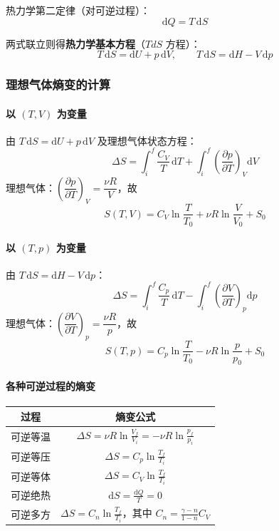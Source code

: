 \documentclass[UTF8]{ctexart}
\begin{document}
热力学第二定律（对可逆过程）：
\[
\mathrm{d}Q=T\,\mathrm{d}S
\]

两式联立则得\textbf{热力学基本方程}（$TdS$ 方程）：
\[
\boxed{T\,\mathrm{d}S=\mathrm{d}U+p\,\mathrm{d}V},\qquad
\boxed{T\,\mathrm{d}S=\mathrm{d}H-V\,\mathrm{d}p}
\]

\subsubsection{理想气体熵变的计算}

\paragraph{以 $(T,V)$ 为变量}
由 $T\,\mathrm{d}S=\mathrm{d}U+p\,\mathrm{d}V$ 及理想气体状态方程：
\[
\Delta S=\int_i^f\frac{C_V}{T}\,\mathrm{d}T+\int_i^f\left(\frac{\partial p}{\partial T}\right)_V\mathrm{d}V
\]
理想气体：$\left(\dfrac{\partial p}{\partial T}\right)_V=\dfrac{\nu R}{V}$，故
\[
\boxed{S(T,V)=C_V\ln\frac{T}{T_0}+\nu R\ln\frac{V}{V_0}+S_0}
\]

\paragraph{以 $(T,p)$ 为变量}
由 $T\,\mathrm{d}S=\mathrm{d}H-V\,\mathrm{d}p$：
\[
\Delta S=\int_i^f\frac{C_p}{T}\,\mathrm{d}T-\int_i^f\left(\frac{\partial V}{\partial T}\right)_p\mathrm{d}p
\]
理想气体：$\left(\dfrac{\partial V}{\partial T}\right)_p=\dfrac{\nu R}{p}$，故
\[
\boxed{S(T,p)=C_p\ln\frac{T}{T_0}-\nu R\ln\frac{p}{p_0}+S_0}
\]

\paragraph{各种可逆过程的熵变}

\begin{center}
\begin{tabular}{c|c}
\hline
过程 & 熵变公式 \\
\hline
可逆等温 & $\displaystyle\Delta S=\nu R\ln\frac{V_f}{V_i}=-\nu R\ln\frac{p_f}{p_i}$ \\
可逆等压 & $\displaystyle\Delta S=C_p\ln\frac{T_f}{T_i}$ \\
可逆等体 & $\displaystyle\Delta S=C_V\ln\frac{T_f}{T_i}$ \\
可逆绝热 & $\displaystyle\mathrm{d}S=\frac{\mathrm{d}Q}{T}=0$ \\
可逆多方 & $\displaystyle\Delta S=C_n\ln\frac{T_f}{T_i}$，其中 $\displaystyle C_n=\frac{\gamma-n}{1-n}C_V$ \\
\hline
\end{tabular}
\end{center}
\end{document}
